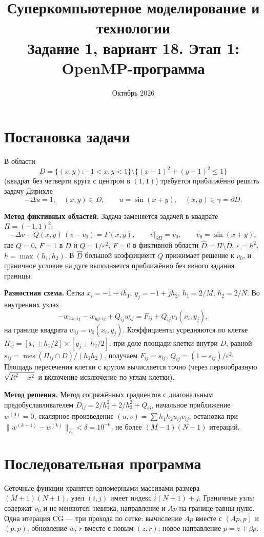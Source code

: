 \documentclass[11pt,a4paper]{article}
\title{Суперкомпьютерное моделирование и технологии\\[0.3em]
\large Задание 1, вариант 18. Этап 1: OpenMP-программа}
\author{\student}
\date{Октябрь 2026}
\begin{document}
\maketitle

\section{Постановка задачи}

В области
\[
D = \{(x,y): -1<x,y<1\} \setminus \{(x-1)^2+(y-1)^2 \le 1\}
\]
(квадрат без четверти круга с центром в $(1,1)$) требуется приближённо решить задачу Дирихле
\[
-\Delta u = 1, \quad (x,y)\in D, \qquad u = \sin(x+y), \quad (x,y)\in\gamma = \partial D.
\]

\textbf{Метод фиктивных областей.} Задача заменяется задачей в квадрате $\Pi=(-1,1)^2$:
\[
-\Delta v + Q(x,y)\,(v - v_0) = F(x,y), \qquad v\big|_{\partial\Pi} = v_0, \qquad v_0 = \sin(x+y),
\]
где $Q=0$, $F=1$ в $D$ и $Q=1/\varepsilon^2$, $F=0$ в фиктивной области $\hat D = \Pi\setminus\overline D$;
$\varepsilon = h^2$, $h=\max(h_1,h_2)$. В $\hat D$ большой коэффициент $Q$ прижимает решение к $v_0$,
и граничное условие на дуге выполняется приближённо без явного задания границы.

\textbf{Разностная схема.} Сетка $x_i=-1+ih_1$, $y_j=-1+jh_2$, $h_1=2/M$, $h_2=2/N$. Во внутренних узлах
\[
-w_{\bar x x,ij} - w_{\bar y y,ij} + Q_{ij} w_{ij} = F_{ij} + Q_{ij} v_0(x_i,y_j),
\]
на границе квадрата $w_{ij}=v_0(x_i,y_j)$. Коэффициенты усредняются по клетке
$\Pi_{ij}=[x_i\pm h_1/2]\times[y_j\pm h_2/2]$: при доле площади клетки внутри $D$, равной
$s_{ij} = \operatorname{mes}(\Pi_{ij}\cap D)/(h_1h_2)$, получаем $F_{ij}=s_{ij}$,
$Q_{ij}=(1-s_{ij})/\varepsilon^2$. Площадь пересечения клетки с кругом вычисляется точно
(через первообразную $\sqrt{R^2-x^2}$ и включение-исключение по углам клетки).

\textbf{Метод решения.} Метод сопряжённых градиентов с диагональным предобуславливателем
$D_{ij} = 2/h_1^2+2/h_2^2+Q_{ij}$, начальное приближение $w^{(0)}=0$, скалярное произведение
$(u,v)=\sum h_1h_2u_{ij}v_{ij}$, остановка при $\|w^{(k+1)}-w^{(k)}\|_E<\delta=10^{-6}$,
не более $(M-1)(N-1)$ итераций.

\section{Последовательная программа}

Сеточные функции хранятся одномерными массивами размера $(M+1)(N+1)$, узел $(i,j)$ имеет индекс
$i(N+1)+j$. Граничные узлы содержат $v_0$ и не меняются; невязка, направление и $A p$ на границе
равны нулю. Одна итерация CG — три прохода по сетке: вычисление $Ap$ вместе с $(Ap,p)$ и $(p,p)$;
обновление $w$, $r$ вместе с новым $(z,r)$; новое направление $p=z+\beta p$.
\end{document}
